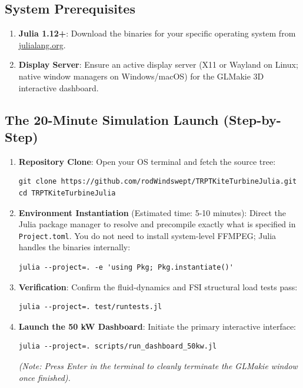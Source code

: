 \documentclass[11pt,a4paper]{article}
\begin{document}
\subsection{System Prerequisites}
\begin{enumerate}
    \item \textbf{Julia 1.12+}: Download the binaries for your specific operating system from \href{https://julialang.org/downloads/}{julialang.org}.
    \item \textbf{Display Server}: Ensure an active display server (X11 or Wayland on Linux; native window managers on Windows/macOS) for the GLMakie 3D interactive dashboard.
\end{enumerate}

\subsection{The 20-Minute Simulation Launch (Step-by-Step)}
\begin{enumerate}
    \item \textbf{Repository Clone}: Open your OS terminal and fetch the source tree:
\begin{verbatim}
git clone https://github.com/rodWindswept/TRPTKiteTurbineJulia.git
cd TRPTKiteTurbineJulia
\end{verbatim}
    \item \textbf{Environment Instantiation} (Estimated time: 5-10 minutes): Direct the Julia package manager to resolve and precompile exactly what is specified in \texttt{Project.toml}. You do not need to install system-level FFMPEG; Julia handles the binaries internally:
\begin{verbatim}
julia --project=. -e 'using Pkg; Pkg.instantiate()'
\end{verbatim}
    \item \textbf{Verification}: Confirm the fluid-dynamics and FSI structural load tests pass:
\begin{verbatim}
julia --project=. test/runtests.jl
\end{verbatim}
    \item \textbf{Launch the 50 kW Dashboard}: Initiate the primary interactive interface:
\begin{verbatim}
julia --project=. scripts/run_dashboard_50kw.jl
\end{verbatim}
    \textit{(Note: Press Enter in the terminal to cleanly terminate the GLMakie window once finished).}
\end{enumerate}
\end{document}
